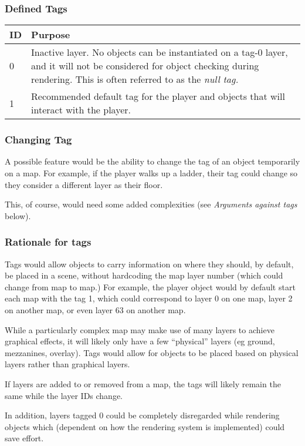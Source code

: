 \documentclass [12pt,a4paper]{article}
\begin{document}
\subsubsection{Defined Tags}

\begin{tabular}{ l p{5in} }
  ID & Purpose \\
  \hline
  0  & Inactive layer.  No objects can be instantiated on a tag-0
       layer, and it will not be considered for object checking during 
       rendering.  This is often referred to as the \emph{null tag.} \\
  1  & Recommended default tag for the player and objects that will 
       interact with the player. \\
\end{tabular}

\subsubsection{Changing Tag}

A possible feature would be the ability to change the tag of an object
temporarily on a map.  For example, if the player walks up a ladder,
their tag could change so they consider a different layer as their
floor.

This, of course, would need some added complexities (see
\emph{Arguments against tags} below).

\subsubsection{Rationale for tags}

Tags would allow objects to carry information on where they should, by
default, be placed in a scene, without hardcoding the map layer number
(which could change from map to map.)  For example, the player object
would by default start each map with the tag 1, which could correspond
to layer 0 on one map, layer 2 on another map, or even layer 63 on
another map.

While a particularly complex map may make use of many layers to
achieve graphical effects, it will likely only have a few ``physical''
layers (eg ground, mezzanines, overlay).  Tags would allow for objects
to be placed based on physical layers rather than graphical layers.

If layers are added to or removed from a map, the tags will likely
remain the same while the layer IDs change.

In addition, layers tagged 0 could be completely disregarded while
rendering objects which (dependent on how the rendering system is
implemented) could save effort.
\end{document}
